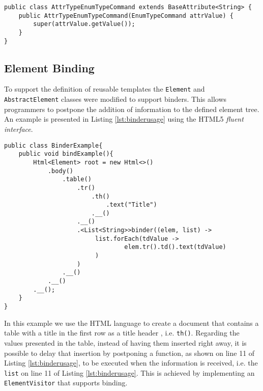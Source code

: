 \begin{minipage}{\linewidth}
\begin{lstlisting}[caption={Attribute Receiving An Enumeration Instance},label={lst:enumusage}]
public class AttrTypeEnumTypeCommand extends BaseAttribute<String> {
    public AttrTypeEnumTypeCommand(EnumTypeCommand attrValue) {
        super(attrValue.getValue());
    }
}
\end{lstlisting}
\end{minipage}

\newpage

\subsection{Element Binding}
\label{sec:elementbinding}

\noindent
To support the definition of reusable templates the \texttt{Element} and \texttt{AbstractElement} classes were modified to support binders. This allows programmers to postpone the addition of information to the defined element tree. An example is presented in Listing \ref{lst:binderusage} using the \ac{HTML}5 \textit{fluent interface}.

\bigskip


\begin{minipage}{\linewidth}
\begin{lstlisting}[caption={Binder Usage Example},label={lst:binderusage}]
public class BinderExample{
    public void bindExample(){
        Html<Element> root = new Html<>()
            .body()
                .table()
                    .tr()
                        .th()
                            .text("Title")
                        .__()
                    .__()
                    .<List<String>>binder((elem, list) ->
                         list.forEach(tdValue ->
                                 elem.tr().td().text(tdValue)
                         )
                    )
                .__()
            .__()
        .__();
    }
}
\end{lstlisting}
\end{minipage}

\noindent
In this example we use the \ac{HTML} language to create a document that contains a table with a title in the first row as a title header , i.e. \texttt{th()}. Regarding the values presented in the table, instead of having them inserted right away, it is possible to delay that insertion by postponing a function, as shown on line 11 of Listing \ref{lst:binderusage}, to be executed when the information is received, i.e. the \texttt{list} on line 11 of Listing \ref{lst:binderusage}. This is achieved by implementing an \texttt{ElementVisitor} that supports binding. 

